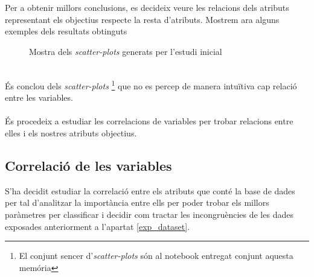 \documentclass[a4paper, 11pt]{article}
\begin{document}
Per a obtenir millors conclusions, es decideix veure les relacions dels atributs representant els objectius respecte la resta d'atributs. Mostrem ara alguns exemples dels resultats obtinguts
\begin{figure}[h]
    \centering
    \caption{Mostra dels \textit{scatter-plots} generats per l'estudi inicial}
\end{figure}\\
\hspace{-1.4 em}És conclou dels \textit{scatter-plots} \footnote{El conjunt sencer d'\textit{scatter-plots} són al notebook entregat conjunt aquesta memória} que no es percep de manera intuïtiva cap relació entre les variables. \\\\
És procedeix a estudiar les correlacions de variables per trobar relacions entre elles i els nostres atributs objectius.
\newpage
\subsection{Correlació de les variables}\label{correlacio}
S'ha decidit estudiar la correlació entre els atributs que conté la base de dades per tal d'analitzar la importància entre ells per poder trobar els millors paràmetres per classificar i decidir com tractar les incongruències de les dades exposades anteriorment a l'apartat \textcolor{blue}{\ref{exp_dataset}}.
\end{document}
